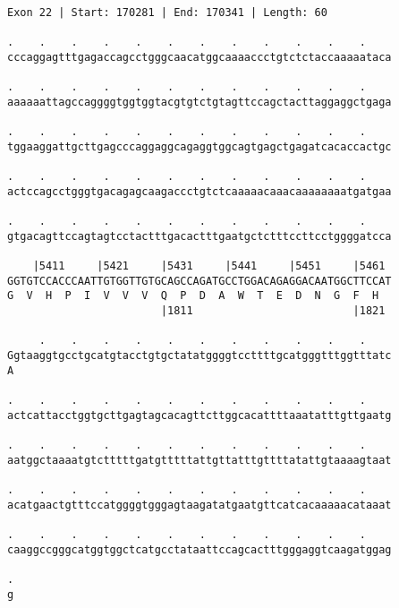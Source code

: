\documentclass{article}
\begin{document}
\begin{Verbatim}
Exon 22 | Start: 170281 | End: 170341 | Length: 60
 
.    .    .    .    .    .    .    .    .    .    .    .    
cccaggagtttgagaccagcctgggcaacatggcaaaaccctgtctctaccaaaaataca
  
.    .    .    .    .    .    .    .    .    .    .    .    
aaaaaattagccaggggtggtggtacgtgtctgtagttccagctacttaggaggctgaga
  
.    .    .    .    .    .    .    .    .    .    .    .    
tggaaggattgcttgagcccaggaggcagaggtggcagtgagctgagatcacaccactgc
  
.    .    .    .    .    .    .    .    .    .    .    .    
actccagcctgggtgacagagcaagaccctgtctcaaaaacaaacaaaaaaaatgatgaa
  
.    .    .    .    .    .    .    .    .    .    .    .    
gtgacagttccagtagtcctactttgacactttgaatgctctttccttcctggggatcca
  
    |5411     |5421     |5431     |5441     |5451     |5461 
GGTGTCCACCCAATTGTGGTTGTGCAGCCAGATGCCTGGACAGAGGACAATGGCTTCCAT
G  V  H  P  I  V  V  V  Q  P  D  A  W  T  E  D  N  G  F  H  
                        |1811                         |1821 
  
     .    .    .    .    .    .    .    .    .    .    .    
Ggtaaggtgcctgcatgtacctgtgctatatggggtccttttgcatgggtttggtttatc
A                                                           
  
.    .    .    .    .    .    .    .    .    .    .    .    
actcattacctggtgcttgagtagcacagttcttggcacattttaaatatttgttgaatg
  
.    .    .    .    .    .    .    .    .    .    .    .    
aatggctaaaatgtctttttgatgtttttattgttatttgttttatattgtaaaagtaat
  
.    .    .    .    .    .    .    .    .    .    .    .    
acatgaactgtttccatggggtgggagtaagatatgaatgttcatcacaaaaacataaat
  
.    .    .    .    .    .    .    .    .    .    .    .    
caaggccgggcatggtggctcatgcctataattccagcactttgggaggtcaagatggag
  
.
g
\end{Verbatim}
\newpage
\end{document}
